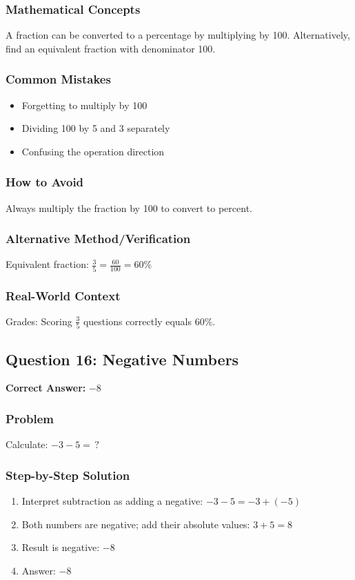 \documentclass[12pt,a4paper]{article}
\begin{document}
\subsubsection*{Mathematical Concepts}
A fraction can be converted to a percentage by multiplying by 100. Alternatively, find an equivalent fraction with denominator 100.

\subsubsection*{Common Mistakes}
\begin{itemize}
    \item Forgetting to multiply by 100
    \item Dividing 100 by 5 and 3 separately
    \item Confusing the operation direction
\end{itemize}

\subsubsection*{How to Avoid}
Always multiply the fraction by 100 to convert to percent.

\subsubsection*{Alternative Method/Verification}
Equivalent fraction: $\frac{3}{5} = \frac{60}{100} = 60\%$ 

\subsubsection*{Real-World Context}
Grades: Scoring $\frac{3}{5}$ questions correctly equals $60\%$.

\vspace{0.5cm}

\subsection*{Question 16: Negative Numbers}

\textbf{Correct Answer:} $-8$

\subsubsection*{Problem}
Calculate: $-3 - 5 = \,?$

\subsubsection*{Step-by-Step Solution}
\begin{enumerate}
    \item Interpret subtraction as adding a negative: $-3 - 5 = -3 + (-5)$
    \item Both numbers are negative; add their absolute values: $3 + 5 = 8$
    \item Result is negative: $-8$
    \item Answer: $-8$
\end{enumerate}
\end{document}

